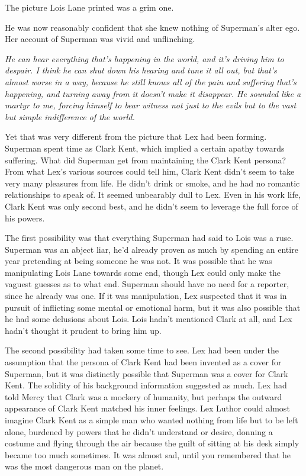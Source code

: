 The picture Lois Lane printed was a grim one.

He was now reasonably confident that she knew nothing of Superman's
alter ego. Her account of Superman was vivid and unflinching.

\emph{He can hear everything that's happening in the world, and it's
driving him to despair. I think he can shut down his hearing and tune it
all out, but that's almost worse in a way, because he still knows all of
the pain and suffering that's happening, and turning away from it
doesn't make it disappear. He sounded like a martyr to me, forcing
himself to bear witness not just to the evils but to the vast but simple
indifference of the world.}

Yet that was very different from the picture that Lex had been forming.
Superman spent time as Clark Kent, which implied a certain apathy
towards suffering. What did Superman get from maintaining the Clark Kent
persona? From what Lex's various sources could tell him, Clark Kent
didn't seem to take very many pleasures from life. He didn't drink or
smoke, and he had no romantic relationships to speak of. It seemed
unbearably dull to Lex. Even in his work life, Clark Kent was only
second best, and he didn't seem to leverage the full force of his
powers.

The first possibility was that everything Superman had said to Lois was
a ruse. Superman was an abject liar, he'd already proven as much by
spending an entire year pretending at being someone he was not. It was
possible that he was manipulating Lois Lane towards some end, though Lex
could only make the vaguest guesses as to what end. Superman should have
no need for a reporter, since he already was one. If it was
manipulation, Lex suspected that it was in pursuit of inflicting some
mental or emotional harm, but it was also possible that he had some
delusions about Lois. Lois hadn't mentioned Clark at all, and Lex hadn't
thought it prudent to bring him up.

The second possibility had taken some time to see. Lex had been under
the assumption that the persona of Clark Kent had been invented as a
cover for Superman, but it was distinctly possible that Superman was a
cover for Clark Kent. The solidity of his background information
suggested as much. Lex had told Mercy that Clark was a mockery of
humanity, but perhaps the outward appearance of Clark Kent matched his
inner feelings. Lex Luthor could almost imagine Clark Kent as a simple
man who wanted nothing from life but to be left alone, burdened by
powers that he didn't understand or desire, donning a costume and flying
through the air because the guilt of sitting at his desk simply became
too much sometimes. It was almost sad, until you remembered that he was
the most dangerous man on the planet.

